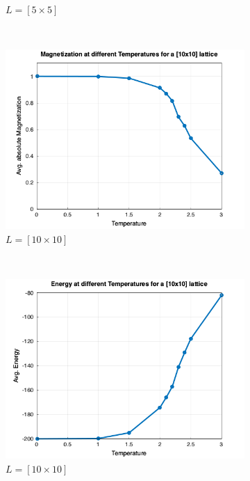 \begin{figure}[t]
\begin{subfigure}{0.5\textwidth}
		\caption{$L=[5\times5]$}
		\label{sfig:sublabel2}
	\end{subfigure}\\
	\begin{subfigure}{0.5\textwidth}
		\includegraphics[width=\textwidth]{./img/avg_mag_10.png}
		\caption{$L=[10\times10]$}
		\label{sfig:sublabel3}
	\end{subfigure}%
	~
	\begin{subfigure}{0.5\textwidth}
		\includegraphics[width=\textwidth]{./img/avg_en_10.png}
		\caption{$L=[10\times10]$}
		\label{sfig:sublabel4}
	\end{subfigure}\\
	\begin{subfigure}{0.5\textwidth}

\end{subfigure}
\end{figure}
